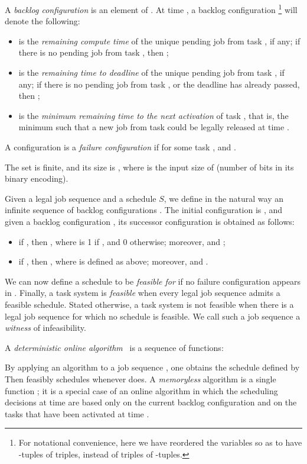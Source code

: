 \documentclass{llncs}
\newcommand{\sched}{\ensuremath{S}}
\begin{document}
A \emph{backlog configuration} is an element of . 
At time , a backlog configuration  \footnote{For notational convenience, here we have reordered the variables so as to have -tuples of triples, instead of triples of -tuples.} will denote the following: 
\begin{itemize}
\item  is the \emph{remaining compute time} of the unique pending job from task , if any; if there is no pending job from task , then ; 
\item  is the \emph{remaining time to deadline} of the unique pending job from task , if any; if there is no pending job from task , or the deadline has already passed, then ; 
\item  is the \emph{minimum remaining time to the next activation} of task , that is, the minimum  such that a new job from task  could be legally released at time . 
\end{itemize}
A configuration  is a \emph{failure configuration} if for some task ,  and .  
\begin{remark}
\label{rmk:state-size}
The set  is finite, and its size is , where  is the input size of  (number of bits in its binary encoding). 
\end{remark}

Given a legal job sequence  and a schedule \sched, we define in the natural way an infinite sequence of backlog configurations . The initial configuration is , and given a backlog configuration , its successor configuration  is obtained as follows: 
\begin{itemize}
\item if , then , where  is 1 if , and 0 otherwise; moreover,  and ; 
\item if , then , where  is defined as above; moreover,  and .  
\end{itemize}
We can now define a schedule  to be \emph{feasible for}  if no failure configuration appears in . Finally, a task system  is \emph{feasible} when every legal job sequence admits a feasible schedule. Stated otherwise, a task system is not feasible when there is a legal job sequence for which no schedule is feasible. We call such a job sequence a \emph{witness} of infeasibility. 

A \emph{deterministic online algorithm} \alg\ is a sequence of functions: 

By applying an algorithm  to a job sequence , one obtains the schedule  defined by  Then  feasibly schedules  whenever  does. 
\newcommand{\malg}{\ensuremath{\mathrm{Malg}}}
A \emph{memoryless} algorithm is a single function ; it is a special case of an online algorithm in which the scheduling decisions at time  are based only on the current backlog configuration and on the tasks that have been activated at time . 
\end{document}
